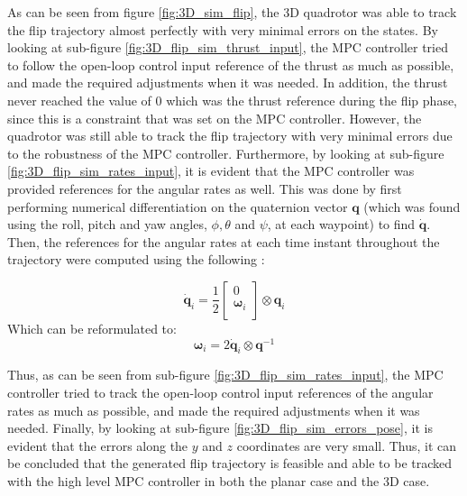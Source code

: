 \documentclass{thesisreport}
\begin{document}
\newpage

As can be seen from figure \ref{fig:3D_sim_flip}, the 3D quadrotor was able to track the flip trajectory almost perfectly with very minimal errors on the states. By looking at sub-figure \ref{fig:3D_flip_sim_thrust_input}, the MPC controller tried to follow the open-loop control input reference of the thrust as much as possible, and made the required adjustments when it was needed. In addition, the thrust never reached the value of 0 which was the thrust reference during the flip phase, since this is a constraint that was set on the MPC controller. However, the quadrotor was still able to track the flip trajectory with very minimal errors due to the robustness of the MPC controller. Furthermore, by looking at sub-figure \ref{fig:3D_flip_sim_rates_input}, it is evident that the MPC controller was provided references for the angular rates as well. This was done by first performing numerical differentiation on the quaternion vector $\bm{q}$ (which was found using the roll, pitch and yaw angles, $\phi, \theta$ and $\psi$, at each waypoint) to find $\dot{\bm{q}}$. Then, the references for the angular rates at each time instant throughout the trajectory were computed using the following \cite{Erskine2021}:

\begin{equation}
        \dot{\bm{q}}_i = \frac{1}{2} \begin{bmatrix}
            0 \\ \bm{\omega}_i \\
        \end{bmatrix} \otimes \bm{q}_i
    \end{equation}
    Which can be reformulated to: 
    \begin{equation}
        \bm{\omega}_i = 2 \dot{\bm{q}}_i \otimes \bm{q}^{-1}
    \end{equation}

Thus, as can be seen from sub-figure \ref{fig:3D_flip_sim_rates_input}, the MPC controller tried to track the open-loop control input references of the angular rates as much as possible, and made the required adjustments when it was needed.  Finally, by looking at sub-figure \ref{fig:3D_flip_sim_errors_pose}, it is evident that the errors along the $y$ and $z$ coordinates are very small. Thus, it can be concluded that the generated flip trajectory is feasible and able to be tracked with the high level MPC controller in both the planar case and the 3D case.
\end{document}
